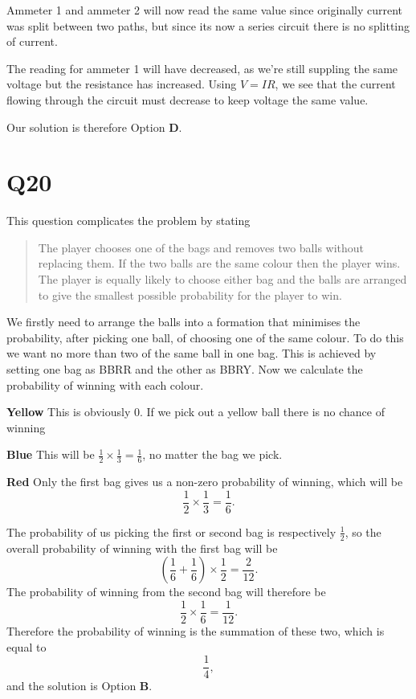 \documentclass[11pt]{article}
\begin{document}
Ammeter 1 and ammeter 2 will now read the same value since originally current was split between two paths, but since its now a series circuit there is no splitting of current. 

The reading for ammeter 1 will have decreased, as we're still suppling the same voltage but the resistance has increased.  Using $V=IR$, we see that the current flowing through the circuit must decrease to keep voltage the same value.

Our solution is therefore Option \textbf{D}.


\section*{Q20}
This question complicates the problem by stating 
\begin{quotation}
The player chooses one of the bags and removes two balls without replacing them. If the two balls are the same colour then the player wins. The player is equally likely to choose either bag and the balls are arranged to give the smallest possible probability for the player to win.
\end{quotation}
We firstly need to arrange the balls into a formation that minimises the probability, after picking one ball, of choosing one of the same colour.  To do this we want no more than two of the same ball in one bag.  This is achieved by setting one bag as BBRR and the other as BBRY.  Now we calculate the probability of winning with each colour.

\textbf{Yellow}  This is obviously 0.  If we pick out a yellow ball there is no chance of winning

\textbf{Blue}  This will be $\frac{1}{2} \times \frac{1}{3} = \frac{1}{6}$, no matter the bag we pick.  

\textbf{Red} Only the first bag gives us a non-zero probability  of winning, which will be 
\begin{equation*}
\frac{1}{2} \times \frac{1}{3} = \frac{1}{6}.
\end{equation*}

The probability of us picking the first or second bag is respectively $\frac{1}{2}$, so the overall probability of winning with the first bag will be 
\begin{equation*}
\left(\frac{1}{6} + \frac{1}{6}\right) \times \frac{1}{2} = \frac{2}{12}.
\end{equation*}  
The probability of winning from the second bag will therefore be 
\begin{equation*}
\frac{1}{2} \times \frac{1}{6} = \frac{1}{12}.
\end{equation*}  
Therefore the probability of winning is the summation of these two, which is equal to 
\begin{equation*}
\frac{1}{4},
\end{equation*}
and the solution is Option \textbf{B}.
\end{document}
